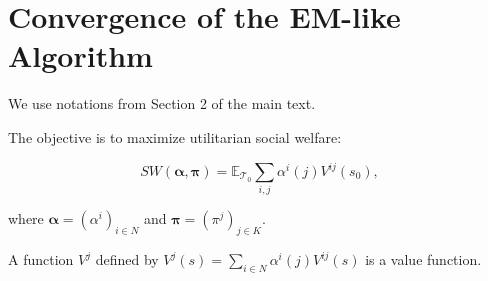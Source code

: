 



% 



\appendix



\section{Convergence of the EM-like Algorithm}

We use notations from Section 2 of the main text.

The objective is to maximize utilitarian social welfare:

$$SW(\boldsymbol\alpha, \boldsymbol\pi) = \mathbb{E}_{\mathcal{T}_0} \sum_{i, j} \alpha^i(j) V^{ij}(s_0),$$

\noindent where $\boldsymbol\alpha = (\alpha^i)_{i \in N}$ and $\boldsymbol\pi = (\pi^{j})_{j \in K}$.







\begin{lemma}\label{lemma:app}
    A function $V^j$ defined by $V^j(s) = \sum_{i \in N} \alpha^i(j) V^{ij}(s)$ is a value function.
\end{lemma}

